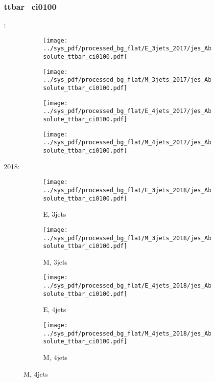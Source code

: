 \documentclass{beamer}
\begin{document}
\begin{frame}
\frametitle{ttbar_ci0100}
\fontsize{5}{1}:
\begin{figure}
\centering
\begin{subfigure}[b]{0.24\textwidth}
\texttt{[image: ../sys\_pdf/processed\_bg\_flat/E\_3jets\_2017/jes\_Absolute\_ttbar\_ci0100.pdf]}
\end{subfigure}
\begin{subfigure}[b]{0.24\textwidth}
\texttt{[image: ../sys\_pdf/processed\_bg\_flat/M\_3jets\_2017/jes\_Absolute\_ttbar\_ci0100.pdf]}
\end{subfigure}
\begin{subfigure}[b]{0.24\textwidth}
\texttt{[image: ../sys\_pdf/processed\_bg\_flat/E\_4jets\_2017/jes\_Absolute\_ttbar\_ci0100.pdf]}
\end{subfigure}
\begin{subfigure}[b]{0.24\textwidth}
\texttt{[image: ../sys\_pdf/processed\_bg\_flat/M\_4jets\_2017/jes\_Absolute\_ttbar\_ci0100.pdf]}
\end{subfigure}
\end{figure}
2018:
\begin{figure}
\centering
\begin{subfigure}[b]{0.24\textwidth}
\texttt{[image: ../sys\_pdf/processed\_bg\_flat/E\_3jets\_2018/jes\_Absolute\_ttbar\_ci0100.pdf]}
\captionsetup{font=tiny}
\caption{E, 3jets}
\end{subfigure}
\begin{subfigure}[b]{0.24\textwidth}
\texttt{[image: ../sys\_pdf/processed\_bg\_flat/M\_3jets\_2018/jes\_Absolute\_ttbar\_ci0100.pdf]}
\captionsetup{font=tiny}
\caption{M, 3jets}
\end{subfigure}
\begin{subfigure}[b]{0.24\textwidth}
\texttt{[image: ../sys\_pdf/processed\_bg\_flat/E\_4jets\_2018/jes\_Absolute\_ttbar\_ci0100.pdf]}
\captionsetup{font=tiny}
\caption{E, 4jets}
\end{subfigure}
\begin{subfigure}[b]{0.24\textwidth}
\texttt{[image: ../sys\_pdf/processed\_bg\_flat/M\_4jets\_2018/jes\_Absolute\_ttbar\_ci0100.pdf]}
\captionsetup{font=tiny}
\caption{M, 4jets}
\end{subfigure}
\end{figure}
\end{frame}
\end{document}
